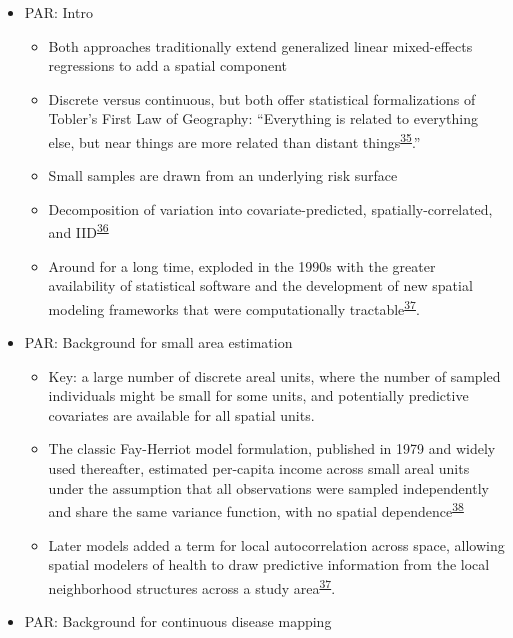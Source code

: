 \documentclass[
]{article}
\providecommand{\tightlist}{%
  \setlength{\itemsep}{0pt}\setlength{\parskip}{0pt}}
\begin{document}
\begin{itemize}
\tightlist
\item
  PAR: Intro

  \begin{itemize}
  \tightlist
  \item
    Both approaches traditionally extend generalized linear mixed-effects regressions to add
    a spatial component
  \item
    Discrete versus continuous, but both offer statistical formalizations of Tobler's First
    Law of Geography: ``Everything is related to everything else, but near things are more related than distant things\textsuperscript{\protect\hyperlink{ref-Tobler1970}{35}}.''
  \item
    Small samples are drawn from an underlying risk surface
  \item
    Decomposition of variation into covariate-predicted, spatially-correlated, and IID\textsuperscript{\protect\hyperlink{ref-Riebler2016}{36}}
  \item
    Around for a long time, exploded in the 1990s with the greater availability of statistical
    software and the development of new spatial modeling frameworks that were computationally
    tractable\textsuperscript{\protect\hyperlink{ref-Besag1991}{37}}.
  \end{itemize}
\item
  PAR: Background for small area estimation

  \begin{itemize}
  \tightlist
  \item
    Key: a large number of discrete areal units, where the number of sampled individuals might
    be small for some units, and potentially predictive covariates are available for all
    spatial units.
  \item
    The classic Fay-Herriot model formulation, published in 1979 and widely used thereafter,
    estimated per-capita income across small areal units under the assumption that all
    observations were sampled independently and share the same variance function, with no
    spatial dependence\textsuperscript{\protect\hyperlink{ref-III1979a}{38}}
  \item
    Later models added a term for local autocorrelation across space, allowing spatial
    modelers of health to draw predictive information from the local neighborhood structures
    across a study area\textsuperscript{\protect\hyperlink{ref-Besag1991}{37}}.
  \end{itemize}
\item
  PAR: Background for continuous disease mapping


\end{itemize}
\end{document}
